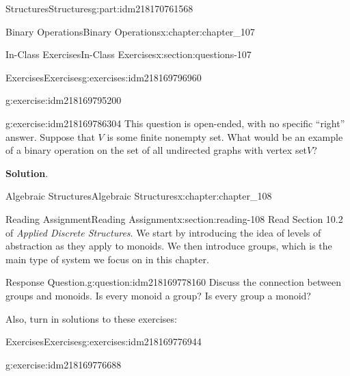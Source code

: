 \documentclass[oneside,10pt,]{book}
\newcommand{\blocktitlefont}{\relax}
\numberwithin{equation}{section}
\begin{document}
\begin{partptx}{Structures}{}{Structures}{}{}{g:part:idm218170761568}
\begin{chapterptx}{Binary Operations}{}{Binary Operations}{}{}{x:chapter:chapter_107}
\begin{sectionptx}{In-Class Exercises}{}{In-Class Exercises}{}{}{x:section:questions-107}
\begin{exercises-subsection-numberless}{Exercises}{}{Exercises}{}{}{g:exercises:idm218169796960}
\begin{exercisegroup}
\begin{divisionexerciseeg}{2}{}{}{g:exercise:idm218169795200}
\begin{enumerate}[label=(\alph*)]
\end{enumerate}
%
\end{divisionexerciseeg}%
\begin{divisionexerciseeg}{3}{}{}{g:exercise:idm218169786304}%
This question is open-ended, with no specific ``right'' answer.  Suppose that \(V\) is some finite nonempty set. What would be an example of a binary operation on the set of all undirected graphs with vertex set\(V\)?%
\par\smallskip%
\noindent\textbf{\blocktitlefont Solution}.\hypertarget{g:solution:idm218169780944}{}\quad{}%
\end{divisionexerciseeg}%
\end{exercisegroup}
\par\medskip\noindent
\end{exercises-subsection-numberless}
\end{sectionptx}
\end{chapterptx}
%
\typeout{************************************************}
\typeout{************************************************}
%
\begin{chapterptx}{Algebraic Structures}{}{Algebraic Structures}{}{}{x:chapter:chapter_108}
\index{}%
%
%
\typeout{************************************************}
\typeout{************************************************}
%
\begin{sectionptx}{Reading Assignment}{}{Reading Assignment}{}{}{x:section:reading-108}
Read Section 10.2 of \emph{Applied Discrete Structures}. We start by introducing the idea of levels of abstraction as they apply to monoids.  We then introduce groups, which is the main type of system we focus on in this chapter.%
\begin{question}{Response Question.}{g:question:idm218169778160}%
Discuss the connection between groups and monoids. Is every monoid a group? Is every group a monoid?%
\end{question}
Also, turn in solutions to these exercises:%
%
%
\typeout{************************************************}
\typeout{************************************************}
%
\begin{exercises-subsection-numberless}{Exercises}{}{Exercises}{}{}{g:exercises:idm218169776944}
\par\medskip\noindent%
%
\begin{exercisegroup}
\begin{divisionexerciseeg}{1}{}{}{g:exercise:idm218169776688}%

\end{divisionexerciseeg}
\end{exercisegroup}
\end{exercises-subsection-numberless}
\end{sectionptx}
\end{chapterptx}
\end{partptx}
\end{document}

